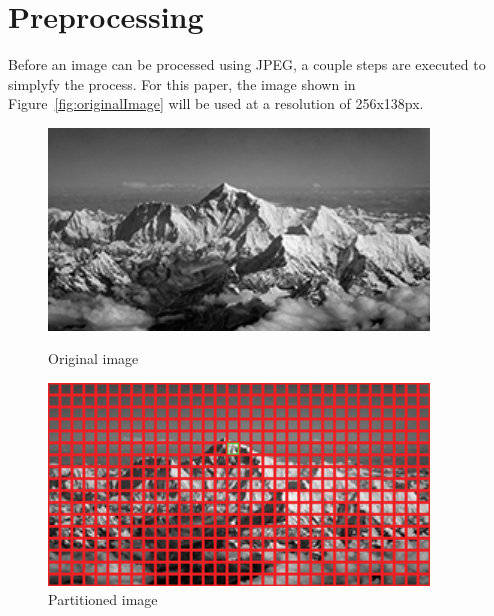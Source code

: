 \documentclass[11pt]{article}
\begin{document}
\section{Preprocessing}
\label{sec: preprocessing}

Before an image can be processed using JPEG, a couple steps are executed to simplyfy the process.
For this paper, the image shown in Figure~\ref{fig:originalImage} will be used at a resolution of 256x138px.

\begin{figure}
  \centering
  \begin{minipage}{0.45\textwidth}
      \centering
      \includegraphics[width=0.9\textwidth]{./images/original.jpg}
      \caption{Original image}
      \label{fig:originalImage}
  \end{minipage}\hfill
  \begin{minipage}{0.45\textwidth}
      \centering
      \includegraphics[width=0.9\textwidth]{./images/partitioned_highlight.jpg}
      \caption{Partitioned image}
      \label{fig:partitionedImage}
  \end{minipage}
\end{figure}
\end{document}
